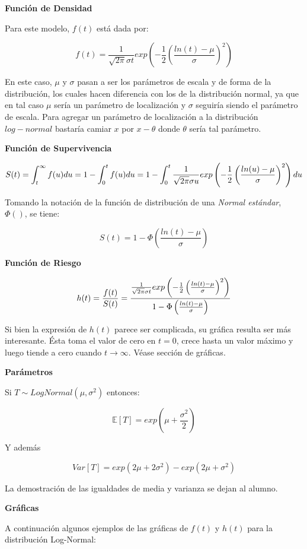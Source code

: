 \documentclass[
  a4paper,
  oneside,
  openany]{book}
\begin{document}
\textbf{Función de Densidad}

Para este modelo, \(f(t)\) está dada por:

\[
f(t)=\frac{1}{\sqrt {2\pi}\sigma t}exp\left(-\frac{1}{2}\left(\frac{ln(t)-\mu}{\sigma}\right)^2\right)
\]

En este caso, \(\mu\) y \(\sigma\) pasan a ser los parámetros de escala y de forma de la distribución, los cuales hacen diferencia con los de la distribución normal, ya que en tal caso \(\mu\) sería un parámetro de localización y \(\sigma\) seguiría siendo el parámetro de escala. Para agregar un parámetro de localización a la distribución \(log-normal\) bastaría camiar \(x\) por \(x-\theta\) donde \(\theta\) sería tal parámetro.

\textbf{Función de Supervivencia}

\[
S(t)=\int_t^{\infty}f(u)du
\\=1-\int_0^{t}f(u)du
\\=1-\int_0^{t}\frac{1}{\sqrt {2\pi}\sigma u}exp\left(-\frac{1}{2}\left(\frac{ln(u)-\mu}{\sigma}\right)^2\right)du
\]

Tomando la notación de la función de distribución de una \emph{Normal estándar}, \(\Phi()\), se tiene:

\[
S(t)=1-\Phi\left(\frac{ln(t)-\mu}{\sigma}\right)
\]

\textbf{Función de Riesgo}

\[
h(t)=\frac{f(t)}{S(t)}
\\=\frac{\frac{1}{\sqrt {2\pi}\sigma t}exp\left(-\frac{1}{2}\left(\frac{ln(t)-\mu}{\sigma}\right)^2\right)}{1-\Phi\left(\frac{ln(t)-\mu}{\sigma}\right)}
\]

Si bien la expresión de \(h(t)\) parece ser complicada, su gráfica resulta ser más interesante. Ésta toma el valor de cero en \(t=0\), crece hasta un valor máximo y luego tiende a cero cuando \(t \rightarrow \infty\). Véase sección de gráficas.

\textbf{Parámetros}

Si \(T\sim LogNormal(\mu,\sigma^2)\) entonces:

\[
\mathbb{E}[T]=exp\left(\mu+\frac{\sigma^2}{2}\right)
\]

Y además

\[
Var[T]=exp(2\mu+2\sigma^2)-exp(2\mu+\sigma^2)
\]

La demostración de las igualdades de media y varianza se dejan al alumno.

\textbf{Gráficas}

A continuación algunos ejemplos de las gráficas de \(f(t)\) y \(h(t)\) para la distribución Log-Normal:
\end{document}
